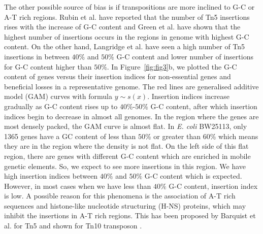 \documentclass[12pt,letterpaper]{article}
\begin{document}
The other possible source of bias is if transpositions are more inclined to G-C or A-T rich regions. Rubin et al. \cite{rubin_essential_2015} have reported that the number of Tn5 insertions rises with the increase of G-C content and Green et al. \cite{green_insertion_2012} have shown that the highest number of insertions occurs in the regions in genome with highest G-C content. On the other hand, Langridge et al. \cite{langridge_simultaneous_2009} have seen a high number of Tn5 insertions in between $40\%$ and $50\%$ G-C content and lower number of insertions for G-C content higher than $50\%$. In Figure~\ref{fig:fig3}b, we plotted the G-C content of genes versus their insertion indices for non-essential genes and beneficial losses in a representative genome. The red lines are generalised additive model (GAM) curves with formula $y \sim s(x)$. Insertion indices increase gradually as G-C content rises up to $40\%$-$50\%$ G-C content, after which insertion indices begin to decrease in almost all genomes. In the region where the genes are most densely packed, the GAM curve is almost flat. In \textit{E. coli} BW25113, only 1365 genes have a GC content of less than $50\%$ or greater than $60\%$ which means they are in the region where the density is not flat. On the left side of this flat region, there are genes with different G-C content which are enriched in mobile genetic elements. So, we expect to see more insertions in this region. We have high insertion indices between $40\%$ and $50\%$ G-C content which is expected. However, in most cases when we have less than $40\%$ G-C content, insertion index is low. A possible reason for this phenomena is the association of A-T rich sequences and histone-like nucleotide structuring (H-NS) proteins, which may inhibit the insertions in A-T rich regions. This has been proposed by Barquist et al. for Tn5 \cite{barquist_comparison_2013} and shown for Tn10 transposon \cite{kimura_nucleoid_2016}.
\end{document}
